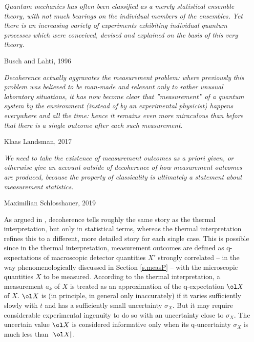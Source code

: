 \documentclass[12pt]{article}
\begin{document}
\bigskip


\nopagebreak
\hfill\parbox[t]{10.8cm}{\footnotesize

{\em Quantum mechanics has often been classified as a merely
statistical ensemble theory, with not much bearings on the individual
members of the ensembles. Yet there is an increasing variety of
experiments exhibiting individual quantum processes which were
conceived, devised and explained on the basis of this very theory.
}

\hfill Busch and Lahti, 1996 \cite[p.5899]{BusL}
}

\bigskip


\nopagebreak
\hfill\parbox[t]{10.8cm}{\footnotesize

{\em Decoherence actually aggravates the measurement problem: where 
previously this problem was believed to be man-made and relevant only 
to rather unusual laboratory situations, it has now become clear that 
''measurement'' of a quantum system by the environment (instead of by 
an experimental physicist) happens everywhere and all the time: hence 
it remains even more miraculous than before that there is a single 
outcome after each such measurement.}

\hfill Klaas Landsman, 2017 \cite[p.443]{Lan2017} 
}

\bigskip


\nopagebreak
\hfill\parbox[t]{10.8cm}{\footnotesize

{\em We need to take the existence of measurement outcomes as a priori
given, or otherwise give an account outside of decoherence of how
measurement outcomes are produced, because the property of classicality
is ultimately a statement about measurement statistics.}


\hfill Maximilian Schlosshauer, 2019 \cite[p.72]{Schl2019}
}

\bigskip

As argued in  \cite[Section 10,5]{Neu.CQP}, decoherence
tells roughly the same story as the thermal interpretation, but only in
statistical terms, whereas the thermal interpretation refines this to a
different, more detailed story for each single case. This is possible
since in the thermal interpretation, measurement outcomes are defined 
as q-expectations of macroscopic detector quantities $X'$ strongly 
correlated -- in the way phenomenologically discussed in Section 
\ref{s.measP} -- with the microscopic quantities $X$ to be measured.
According to the thermal interpretation, a measurement $a_k$ of $X$ is
treated as an approximation of the q-expectation $\ol X$ of $X$. 
$\ol X$ is (in principle, in general only inaccurately)
 if it varies sufficiently slowly with $t$ and has a 
sufficiently small uncertainty $\sigma_X$. But it may require 
considerable experimental ingenuity to do so with an uncertainty close 
to $\sigma_X$. The uncertain value $\ol X$ is considered informative 
only when its q-uncertainty $\sigma_X$ is much less than $|\ol X|$.
\end{document}
